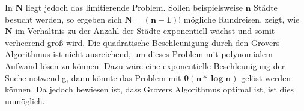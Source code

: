 In $\mathbf{N}$ liegt jedoch das limitierende Problem. Sollen beispielsweise $\mathbf{n}$ Städte besucht werden, so ergeben sich $\mathbf{N=(n-1)!}$ mögliche Rundreisen. 
 zeigt, wie $\mathbf{N}$ im Verhältnis zu der Anzahl der Städte exponentiell wächst und somit verheerend groß wird. 
Die quadratische Beschleunigung durch den Grovers Algorithmus ist nicht ausreichend, um dieses Problem mit polynomialem Aufwand lösen zu können. 
Dazu wäre eine exponentielle Beschleunigung der Suche notwendig, dann könnte das Problem mit $\mathbf{\theta (n * \log n)}$ gelöst werden können. 
Da jedoch bewiesen ist, dass Grovers Algorithmus optimal ist, ist dies unmöglich.

